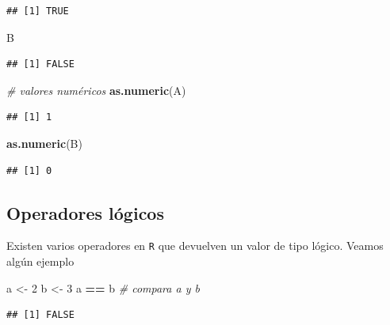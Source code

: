 \documentclass[]{book}
\newenvironment{Shaded}{\begin{snugshade}}{\end{snugshade}}
\newcommand{\KeywordTok}[1]{\textcolor[rgb]{0.13,0.29,0.53}{\textbf{#1}}}
\newcommand{\DecValTok}[1]{\textcolor[rgb]{0.00,0.00,0.81}{#1}}
\newcommand{\StringTok}[1]{\textcolor[rgb]{0.31,0.60,0.02}{#1}}
\newcommand{\CommentTok}[1]{\textcolor[rgb]{0.56,0.35,0.01}{\textit{#1}}}
\newcommand{\OperatorTok}[1]{\textcolor[rgb]{0.81,0.36,0.00}{\textbf{#1}}}
\newcommand{\NormalTok}[1]{#1}
\begin{document}
\begin{verbatim}
## [1] TRUE
\end{verbatim}

\begin{Shaded}
\begin{Highlighting}[]
\NormalTok{B}
\end{Highlighting}
\end{Shaded}

\begin{verbatim}
## [1] FALSE
\end{verbatim}

\begin{Shaded}
\begin{Highlighting}[]
\CommentTok{# valores numéricos}
\KeywordTok{as.numeric}\NormalTok{(A)}
\end{Highlighting}
\end{Shaded}

\begin{verbatim}
## [1] 1
\end{verbatim}

\begin{Shaded}
\begin{Highlighting}[]
\KeywordTok{as.numeric}\NormalTok{(B)}
\end{Highlighting}
\end{Shaded}

\begin{verbatim}
## [1] 0
\end{verbatim}

\subsection{Operadores lógicos}\label{operadores-logicos}

Existen varios operadores en \texttt{R} que devuelven un valor de tipo
lógico. Veamos algún ejemplo

\begin{Shaded}
\begin{Highlighting}[]
\NormalTok{a <-}\StringTok{ }\DecValTok{2}
\NormalTok{b <-}\StringTok{ }\DecValTok{3}
\NormalTok{a }\OperatorTok{==}\StringTok{ }\NormalTok{b  }\CommentTok{# compara a y b}
\end{Highlighting}
\end{Shaded}

\begin{verbatim}
## [1] FALSE
\end{verbatim}
\end{document}
